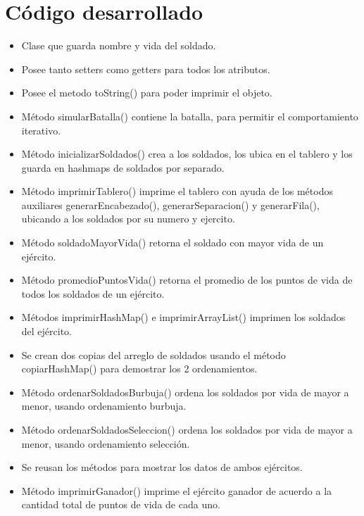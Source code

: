 \documentclass{article}
\begin{document}
\section{Código desarrollado}

\begin{itemize}
	\item Clase que guarda nombre y vida del soldado.
	\item Posee tanto setters como getters para todos los atributos.
	\item Posee el metodo toString() para poder imprimir el objeto.
\end{itemize}
\pagebreak

\begin{itemize}
	\item Método simularBatalla() contiene la batalla, para permitir el comportamiento iterativo.
	\item Método inicializarSoldados() crea a los soldados, los ubica en el tablero y los guarda en hashmaps de soldados por separado.
	\item Método imprimirTablero() imprime el tablero con ayuda de los métodos auxiliares generarEncabezado(), generarSeparacion() y generarFila(), ubicando a los soldados por su numero y ejercito.
	\item Método soldadoMayorVida() retorna el soldado con mayor vida de un ejército.
	\item Método promedioPuntosVida() retorna el promedio de los puntos de vida de todos los soldados de un ejército.
	\item Métodos imprimirHashMap() e imprimirArrayList() imprimen los soldados del ejército.
	\item Se crean dos copias del arreglo de soldados usando el método copiarHashMap() para demostrar los 2 ordenamientos.
	\item Método ordenarSoldadosBurbuja() ordena los soldados por vida de mayor a menor, usando ordenamiento burbuja.
	\item Método ordenarSoldadosSeleccion() ordena los soldados por vida de mayor a menor, usando ordenamiento selección.
	\item Se reusan los métodos para mostrar los datos de ambos ejércitos.
	\item Método imprimirGanador() imprime el ejército ganador de acuerdo a la cantidad total de puntos de vida de cada uno.
\end{itemize}
\pagebreak
\end{document}

